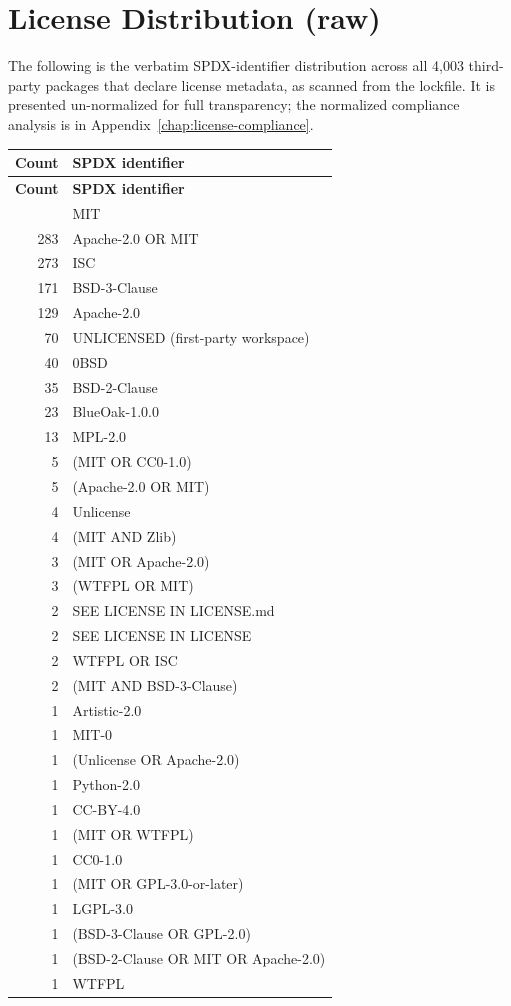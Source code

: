 \section{License Distribution (raw)}

The following is the verbatim SPDX-identifier distribution across all 4{,}003
third-party packages that declare license metadata, as scanned from the
lockfile. It is presented un-normalized for full transparency; the normalized
compliance analysis is in Appendix~\ref{chap:license-compliance}.

\begin{center}
\begin{longtable}{@{}rl@{}}
\toprule
\textbf{Count} & \textbf{SPDX identifier} \\
\midrule
\endfirsthead
\toprule
\textbf{Count} & \textbf{SPDX identifier} \\
\midrule
\endhead
\bottomrule
\endfoot
2919 & MIT \\
283 & Apache-2.0 OR MIT \\
273 & ISC \\
171 & BSD-3-Clause \\
129 & Apache-2.0 \\
70 & UNLICENSED (first-party workspace) \\
40 & 0BSD \\
35 & BSD-2-Clause \\
23 & BlueOak-1.0.0 \\
13 & MPL-2.0 \\
5 & (MIT OR CC0-1.0) \\
5 & (Apache-2.0 OR MIT) \\
4 & Unlicense \\
4 & (MIT AND Zlib) \\
3 & (MIT OR Apache-2.0) \\
3 & (WTFPL OR MIT) \\
2 & SEE LICENSE IN LICENSE.md \\
2 & SEE LICENSE IN LICENSE \\
2 & WTFPL OR ISC \\
2 & (MIT AND BSD-3-Clause) \\
1 & Artistic-2.0 \\
1 & MIT-0 \\
1 & (Unlicense OR Apache-2.0) \\
1 & Python-2.0 \\
1 & CC-BY-4.0 \\
1 & (MIT OR WTFPL) \\
1 & CC0-1.0 \\
1 & (MIT OR GPL-3.0-or-later) \\
1 & LGPL-3.0 \\
1 & (BSD-3-Clause OR GPL-2.0) \\
1 & (BSD-2-Clause OR MIT OR Apache-2.0) \\
1 & WTFPL \\
\end{longtable}
\end{center}


